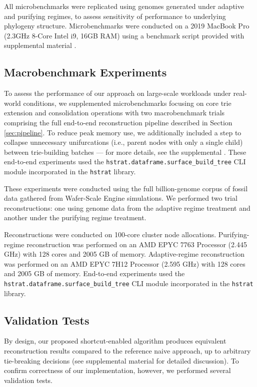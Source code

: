 All microbenchmarks were replicated using genomes generated under adaptive and purifying regimes, to assess sensitivity of performance to underlying phylogeny structure.
Microbenchmarks were conducted on a 2019 MacBook Pro (2.3GHz 8-Core Intel i9, 16GB RAM) using a benchmark script provided with supplemental material \citep{supplemental}.

\subsection{Macrobenchmark Experiments}

To assess the performance of our approach on large-scale workloads under real-world conditions, we supplemented microbenchmarks focusing on core trie extension and consolidation operations with two macrobenchmark trials comprising the full end-to-end reconstruction pipeline described in Section \ref{sec:pipeline}.
To reduce peak memory use, we additionally included a step to collapse unnecessary unifurcations (i.e., parent nodes with only a single child) between trie-building batches --- for more details, see the supplemental \citep{supplemental}.
These end-to-end experiments used the \texttt{hstrat.dataframe.surface\_build\_tree} CLI module incorporated in the \texttt{hstrat} library.

These experiments were conducted using the full billion-genome corpus of fossil data gathered from Wafer-Scale Engine simulations.
We performed two trial reconstructions: one using genome data from the adaptive regime treatment and another under the purifying regime treatment.

Reconstructions were conducted on 100-core cluster node allocations.
Purifying-regime reconstruction was performed on an AMD EPYC 7763 Processor (2.445 GHz) with 128 cores and 2005 GB of memory.
Adaptive-regime reconstruction was performed on an AMD EPYC 7H12 Processor (2.595 GHz) with 128 cores and 2005 GB of memory.
End-to-end experiments used the \texttt{hstrat.dataframe.surface\_build\_tree} CLI module incorporated in the \texttt{hstrat} library.

\subsection{Validation Tests}

By design, our proposed shortcut-enabled algorithm produces equivalent reconstruction results compared to the reference naive approach, up to arbitrary tie-breaking decisions (see supplemental material \citep{supplemental} for detailed discussion).
To confirm correctness of our implementation, however, we performed several validation tests.


